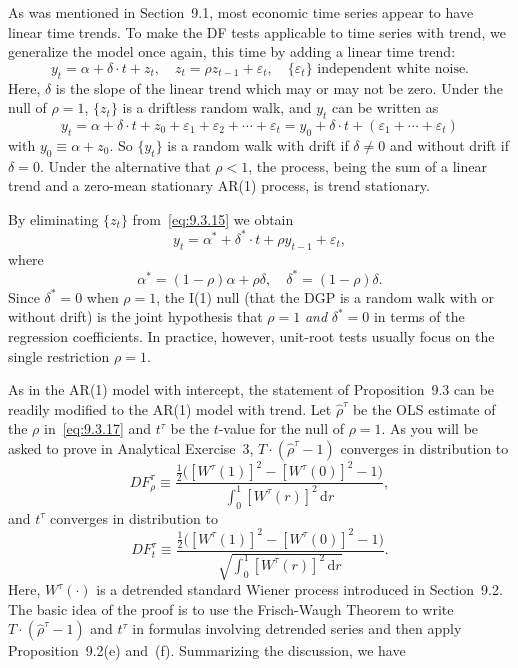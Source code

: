As was mentioned in Section~9.1, most economic time series appear to have linear time trends. To make the DF tests applicable to time series with trend, we
generalize the model once again, this time by adding a linear time trend:
\begin{equation}
\label{eq:9.3.15}
y_t = \alpha + \delta \cdot t + z_t, \quad z_t = \rho z_{t-1} + \varepsilon_t, \quad
\{\varepsilon_t\} \text{ independent white noise.}
\end{equation}
Here, $\delta$ is the slope of the linear trend which may or may not be zero. Under the
null of $\rho = 1$, $\{z_t\}$ is a driftless random walk, and $y_t$ can be written as
\begin{equation}
\label{eq:9.3.16}
y_t = \alpha + \delta \cdot t + z_0 + \varepsilon_1 + \varepsilon_2 + \cdots + \varepsilon_t
= y_0 + \delta \cdot t + (\varepsilon_1 + \cdots + \varepsilon_t)
\end{equation}
with $y_0 \equiv \alpha + z_0$. So $\{y_t\}$ is a random walk with drift if $\delta \neq 0$ and without drift
if $\delta = 0$. Under the alternative that $\rho < 1$, the process, being the sum of a linear
trend and a zero-mean stationary AR(1) process, is trend stationary.

By eliminating $\{z_t\}$ from~\eqref{eq:9.3.15} we obtain
\begin{equation}
\label{eq:9.3.17}
y_t = \alpha^* + \delta^* \cdot t + \rho y_{t-1} + \varepsilon_t,
\end{equation}
where
\begin{equation}
\label{eq:9.3.18}
\alpha^* = (1 - \rho)\alpha + \rho\delta, \quad \delta^* = (1 - \rho)\delta.
\end{equation}
Since $\delta^* = 0$ when $\rho = 1$, the I(1) null (that the DGP is a random walk with
or without drift) is the joint hypothesis that $\rho = 1$ \emph{and} $\delta^* = 0$ in terms of the
regression coefficients. In practice, however, unit-root tests usually focus on the
single restriction $\rho = 1$.

As in the AR(1) model with intercept, the statement of Proposition~9.3 can be
readily modified to the AR(1) model with trend. Let $\hat{\rho}^\tau$ be the OLS estimate of the
$\rho$ in~\eqref{eq:9.3.17} and $t^\tau$ be the $t$-value for the null of $\rho = 1$. As you will be asked to
prove in Analytical Exercise~3, $T \cdot (\hat{\rho}^\tau - 1)$ converges in distribution to
\begin{equation}
\label{eq:9.3.19}
DF_\rho^\tau \equiv \frac{\tfrac{1}{2}\big([W^\tau(1)]^2 - [W^\tau(0)]^2 - 1\big)}{\int_0^1 [W^\tau(r)]^2\,\mathrm{d}r},
\end{equation}
and $t^\tau$ converges in distribution to
\begin{equation}
\label{eq:9.3.20}
DF_t^\tau \equiv \frac{\tfrac{1}{2}\big([W^\tau(1)]^2 - [W^\tau(0)]^2 - 1\big)}{\sqrt{\int_0^1 [W^\tau(r)]^2\,\mathrm{d}r}}.
\end{equation}
Here, $W^\tau(\cdot)$ is a detrended standard Wiener process introduced in Section~9.2. The
basic idea of the proof is to use the Frisch-Waugh Theorem to write $T \cdot (\hat{\rho}^\tau - 1)$ and
$t^\tau$ in formulas involving detrended series and then apply Proposition~9.2(e) and~(f).
Summarizing the discussion, we have

